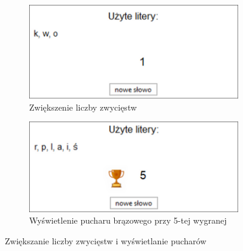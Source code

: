 \documentclass[]{report}
\begin{document}
\begin{figure}[H]
	\begin{subfigure}{0.5\textwidth}
		\centering
		\includegraphics[width=1\linewidth]{9}
		\caption{Zwiększenie liczby zwycięstw}
		\label{fig:zwyciestwa_plus}
	\end{subfigure}
	\hspace{0.5cm}
	\begin{subfigure}{0.5\textwidth}
		\centering
		\includegraphics[width=1\linewidth]{10}
		\caption{Wyświetlenie pucharu brązowego przy 5-tej wygranej}
		\label{fig:puchar5}
	\end{subfigure}
	\caption{Zwiększanie liczby zwycięstw i wyświetlanie pucharów}
\end{figure}
\end{document}
